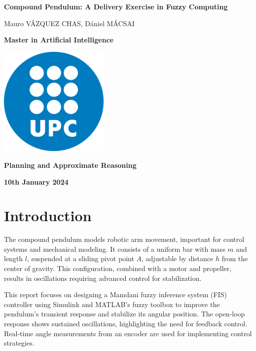 \documentclass[12pt]{article}
\begin{document}
\begin{titlepage}
    \centering
    \vspace*{3cm}
    {\Huge\bfseries Compound Pendulum: A Delivery Exercise in Fuzzy Computing\par}
    \vspace{1.5cm}
    {\large Mauro V\'AZQUEZ CHAS, D\'aniel M\'ACSAI \par}
    \vspace{3cm}
    {\large \textbf{Master in Artificial Intelligence}\par}
    \includegraphics[width=0.4\textwidth]{Logo_UPC.png}\par\vspace{1cm}
    {\large \textbf{Planning and Approximate Reasoning}\par}
    \vspace{1cm}
    {\large\bfseries 10th January 2024\par}
\end{titlepage}

\pagestyle{empty}

\newpage
\tableofcontents
\newpage

\setcounter{page}{1}
\pagestyle{plain}

\section{Introduction}
\label{sec:introduction}

The compound pendulum models robotic arm movement, important for control systems and mechanical modeling. It consists of a uniform bar with mass \( m \) and length \( l \), suspended at a sliding pivot point \( A \), adjustable by distance \( h \) from the center of gravity. This configuration, combined with a motor and propeller, results in oscillations requiring advanced control for stabilization.

This report focuses on designing a Mamdani fuzzy inference system (FIS) controller using Simulink and MATLAB’s fuzzy toolbox to improve the pendulum’s transient response and stabilize its angular position. The open-loop response shows sustained oscillations, highlighting the need for feedback control. Real-time angle measurements from an encoder are used for implementing control strategies.
\end{document}
